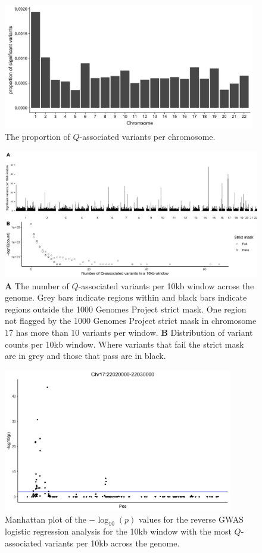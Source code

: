 \documentclass[9pt,article]{template}
\begin{document}
\begin{figure}[tbp]
\centering
\includegraphics[width=11cm,keepaspectratio]{../Figures/CountPerChrom.jpg}
\caption{The proportion of $Q$-associated variants per chromosome.}  
\label{CountPerChrom}
\end{figure}

\begin{figure}[tbp]
\centering
\includegraphics[width=14cm,keepaspectratio]{../Figures/VariantDensity.jpg}
\caption{\textbf{A} The number of $Q$-associated variants per 10kb window across the genome.
Grey bars indicate regions within and black bars indicate regions outside the 1000 Genomes Project strict mask.
One region not flagged by the 1000 Genomes Project strict mask in chromosome 17 has more than 10 variants per window.
\textbf{B} Distribution of variant counts per 10kb window. Where variants that fail the strict mask are in grey and those that pass are in black. }  
\label{VariantDensity}
\end{figure}

\begin{figure}[tbp]
\centering
\includegraphics[width=10cm,keepaspectratio]{../Figures/RegionOver10.jpg}
\caption{Manhattan plot of the $-\log_{10}(p)$ values for the reverse GWAS logistic regression analysis for the 10kb window with the most  $Q$-associated variants per 10kb across the genome.}  
\label{Top10}
\end{figure}
\end{document}
